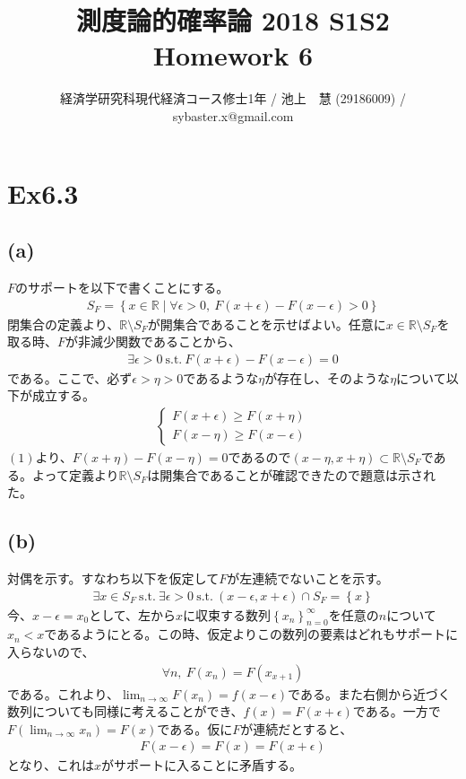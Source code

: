 \documentclass{article}
\begin{document}
\title{測度論的確率論 2018 S1S2 \\ 
Homework 6}
\author{経済学研究科現代経済コース修士1年 / 池上　慧 (29186009) / sybaster.x@gmail.com}
\maketitle

\section{Ex6.3}
\subsection{(a)}
$F$のサポートを以下で書くことにする。
\begin{align*}
	S_F = \left\{ x \in \mathbb{R} \mid \forall \epsilon > 0, \ F(x + \epsilon) - F(x - \epsilon) > 0 \right\}
\end{align*}
閉集合の定義より、$\mathbb{R} \setminus S_F$が開集合であることを示せばよい。任意に$x \in \mathbb{R} \setminus S_F$を取る時、$F$が非減少関数であることから、
\begin{align}
	\exists \epsilon > 0\ \text{s.t.}\ F(x + \epsilon) - F(x - \epsilon) = 0
\end{align}
である。ここで、必ず$\epsilon > \eta > 0$であるような$\eta$が存在し、そのような$\eta$について以下が成立する。
\begin{align*}
	\begin{cases}
	F(x + \epsilon) \geq F(x + \eta)\\
	F(x -\eta) \geq F(x -\epsilon)
	\end{cases}
\end{align*}
$(1)$より、$F(x + \eta) - F(x - \eta) = 0$であるので$(x-\eta, x+\eta) \subset \mathbb{R} \setminus S_F$である。よって定義より$\mathbb{R} \setminus S_F$は開集合であることが確認できたので題意は示された。

\subsection{(b)}
対偶を示す。すなわち以下を仮定して$F$が左連続でないことを示す。
\begin{align*}
	\exists x \in S_F\ \text{s.t.}\ \exists \epsilon > 0\ \text{s.t.}\ (x-\epsilon, x+\epsilon) \cap S_F = \left\{ x \right\}
\end{align*}
今、$x-\epsilon = x_0$として、左から$x$に収束する数列$\left\{ x_n \right\}_{n = 0}^{\infty}$を任意の$n$について$x_n < x$であるようにとる。この時、仮定よりこの数列の要素はどれもサポートに入らないので、
\begin{align*}
	\forall n,\ F(x_n) = F(x_{x+1})
\end{align*}
である。これより、$\lim_{n \to \infty} F(x_n) = f(x-\epsilon)$である。また右側から近づく数列についても同様に考えることができ、$f(x) = F(x + \epsilon)$である。一方で$F(\lim_{n \to \infty} x_n) = F(x)$である。仮に$F$が連続だとすると、
\begin{align*}
F(x - \epsilon) = F(x) = F(x + \epsilon)
\end{align*}
となり、これは$x$がサポートに入ることに矛盾する。
\end{document}
